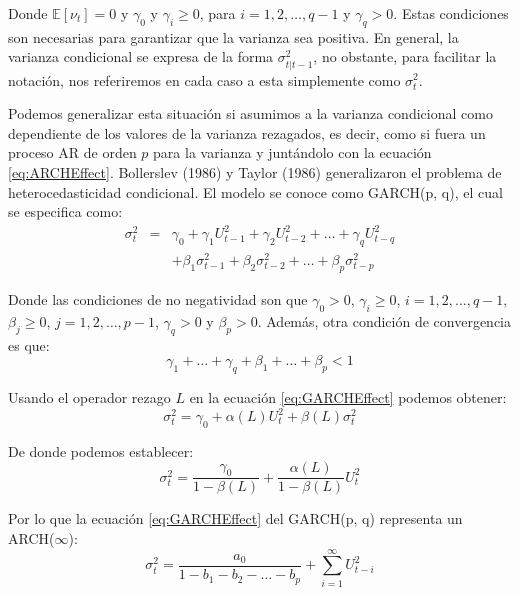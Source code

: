 \documentclass[
]{book}
\begin{document}
Donde \(\mathbb{E}[\nu_t] = 0\) y \(\gamma_0\) y \(\gamma_i \geq 0\), para \(i = 1, 2, \ldots, q-1\) y \(\gamma_q > 0\). Estas condiciones son necesarias para garantizar que la varianza sea positiva. En general, la varianza condicional se expresa de la forma \(\sigma^2_{t | t-1}\), no obstante, para facilitar la notación, nos referiremos en cada caso a esta simplemente como \(\sigma^2_{t}\).

Podemos generalizar esta situación si asumimos a la varianza condicional como dependiente de los valores de la varianza rezagados, es decir, como si fuera un proceso AR de orden \(p\) para la varianza y juntándolo con la ecuación \eqref{eq:ARCHEffect}. Bollerslev (1986) y Taylor (1986) generalizaron el problema de heterocedasticidad condicional. El modelo se conoce como GARCH(p, q), el cual se especifica como:
\begin{eqnarray}
    \sigma^2_t & = & \gamma_0 + \gamma_1 U_{t-1}^2 + \gamma_2 U_{t-2}^2 + \ldots + \gamma_q U_{t-q}^2 \\ \nonumber 
    & & + \beta_1 \sigma^2_{t-1} + \beta_2 \sigma^2_{t-2} + \ldots + \beta_p \sigma^2_{t-p}
    \label{eq:GARCHEffect}
\end{eqnarray}

Donde las condiciones de no negatividad son que \(\gamma_0 > 0\), \(\gamma_i \geq 0\), \(i = 1, 2, \ldots, q-1\), \(\beta_j \geq 0\), \(j = 1, 2, \ldots, p-1\), \(\gamma_q > 0\) y \(\beta_p > 0\). Además, otra condición de convergencia es que:
\begin{equation*}
    \gamma_1 + \ldots + \gamma_q + \beta_1 + \ldots + \beta_p < 1
\end{equation*}

Usando el operador rezago \(L\) en la ecuación \eqref{eq:GARCHEffect} podemos obtener:
\begin{equation}
    \sigma^2_t = \gamma_0 + \alpha(L) U_t^2 + \beta(L) \sigma^2_t
    \label{eq:GARCHEffectL}
\end{equation}

De donde podemos establecer:
\begin{equation}
    \sigma^2_t = \frac{\gamma_0}{1 - \beta(L)} + \frac{\alpha(L)}{1 - \beta(L)} U_t^2 
\end{equation}

Por lo que la ecuación \eqref{eq:GARCHEffect} del GARCH(p, q) representa un ARCH(\(\infty\)):
\begin{equation}
    \sigma^2_t = \frac{a_0}{1 - b_1 - b_2 - \ldots - b_p} + \sum_{i = 1}^\infty U_{t-i}^2 
\end{equation}
\end{document}
